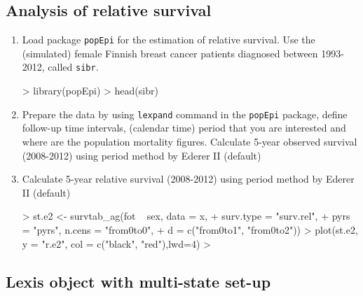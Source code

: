 \subsection{Analysis of relative survival} 
 
\begin{enumerate}
 
\item Load package {\tt popEpi} for the estimation of relative survival. 
Use the (simulated) female Finnish breast cancer patients diagnosed 
between 1993-2012, called {\tt sibr}.
\begin{Schunk}
\begin{Sinput}
> library(popEpi)
> head(sibr)
\end{Sinput}
\end{Schunk}
 

\item Prepare the data by using {\tt lexpand} command in the {\tt popEpi} package, define follow-up time intervals,
(calendar time) period that you are interested and where are the population mortality figures.
Calculate 5-year observed survival (2008-2012) using period method by Ederer II (default)
\begin{Schunk}
\end{Schunk}


\item
Calculate 5-year relative survival (2008-2012) using period method by Ederer II (default)
\begin{Schunk}
\begin{Sinput}
> st.e2 <- survtab_ag(fot ~ sex, data = x,
+                     surv.type = "surv.rel",
+                     pyrs = "pyrs", n.cens = "from0to0",
+                     d = c("from0to1", "from0to2"))
> plot(st.e2, y = "r.e2", col = c("black", "red"),lwd=4)
> 
\end{Sinput}
\end{Schunk}

\end{enumerate}

\subsection{Lexis object with multi-state set-up}

